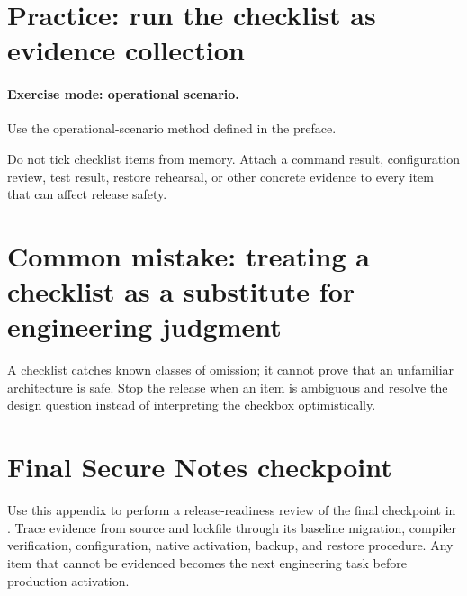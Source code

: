 \section{Practice: run the checklist as evidence collection}
\paragraph{Exercise mode: operational scenario.} Use the operational-scenario method defined in the preface.

Do not tick checklist items from memory. Attach a command result, configuration review, test result, restore rehearsal, or other concrete evidence to every item that can affect release safety.

\section{Common mistake: treating a checklist as a substitute for engineering judgment}
A checklist catches known classes of omission; it cannot prove that an unfamiliar architecture is safe. Stop the release when an item is ambiguous and resolve the design question instead of interpreting the checkbox optimistically.

\section{Final Secure Notes checkpoint}
Use this appendix to perform a release-readiness review of the final checkpoint in . Trace evidence from source and lockfile through its baseline migration, compiler verification, configuration, native activation, backup, and restore procedure. Any item that cannot be evidenced becomes the next engineering task before production activation.
